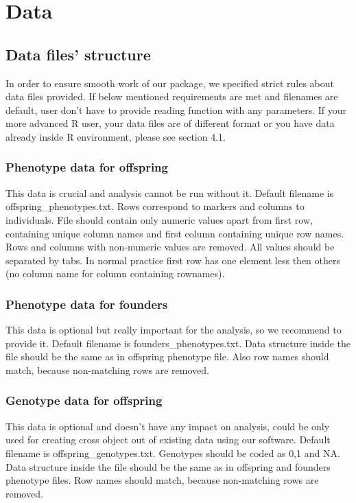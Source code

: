\documentclass{article}
\begin{document}
\section{Data}
\begin{multicols}{2}
\subsection{Data files' structure}
{\noindent}In order to ensure smooth work of our package, we specified strict rules about data files provided. If below mentioned requirements are met and filenames are default, user don't have to provide reading function with any parameters. If your more advanced R user, your data files are of different format or you have data already inside R environment, please see section 4.1. 
\subsubsection{Phenotype data for offspring}
This data is crucial and analysis cannot be run without it. Default filename is offspring\_phenotypes.txt. Rows correspond to markers and columns to individuals. File should contain only numeric values apart from first row, containing unique column names and first column containing unique row names. Rows and columns with non-numeric values are removed. All values should be separated by tabs. In normal practice first row has one element less then others (no column name for column containing rownames).
\subsubsection{Phenotype data for founders}
This data is optional but really important for the analysis, so we recommend to provide it. Default filename is founders\_phenotypes.txt. Data structure inside the file should be the same as in offspring phenotype file. Also row names should match, because non-matching rows are removed.
\subsubsection{Genotype data for offspring}
This data is optional and doesn't have any impact on analysis, could be only used for creating cross object out of existing data using our software. Default filename is offspring\_genotypes.txt. Genotypes should be coded as 0,1 and NA. Data structure inside the file should be the same as in offspring and founders phenotype files. Row names should match, because non-matching rows are removed. 

\end{multicols}
\end{document}
